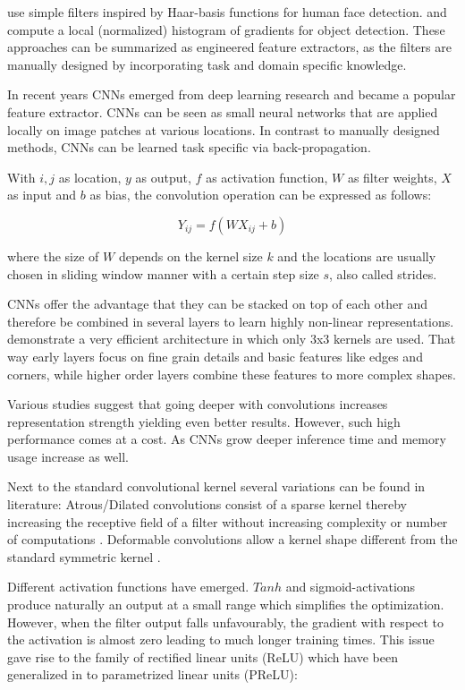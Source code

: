 	\cite{Viola2004} use simple filters inspired by Haar-basis functions for human face detection. \cite{Dalal} and \cite{Lowe2004} compute a local (normalized) histogram of gradients for object detection. These approaches can be summarized as engineered feature extractors, as the filters are manually designed by incorporating task and domain specific knowledge. 
	
	In recent years \acp{CNN} emerged from deep learning research and became a popular feature extractor. \acp{CNN} can be seen as small neural networks that are applied locally on image patches at various locations. In contrast to manually designed methods, \acp{CNN} can be learned task specific via back-propagation.
	
	With $i,j$ as location, $y$ as output, $f$ as activation function, $W$ as filter weights, $X$ as input and $b$ as bias, the convolution operation can be expressed as follows:
	
	$$Y_{ij} = f(WX_{ij} + b)$$
	
	where the size of $W$ depends on the kernel size $k$ and the locations are usually chosen in sliding window manner with a certain step size $s$, also called strides.
	
	\acp{CNN} offer the advantage that they can be stacked on top of each other and therefore be combined in several layers to learn highly non-linear representations.
	 demonstrate a very efficient architecture in which only 3x3 kernels are used. That way early layers focus on fine grain details and basic features like edges and corners, while higher order layers combine these features to more complex shapes. 
	
	Various studies suggest that going deeper with convolutions increases representation strength yielding even better results. However, such high performance comes at a cost. As \acp{CNN} grow deeper inference time and memory usage increase as well.
	
	Next to the standard convolutional kernel several variations can be found in literature: Atrous/Dilated convolutions consist of a sparse kernel thereby increasing the receptive field of a filter without increasing complexity or number of computations . Deformable convolutions allow a kernel shape different from the standard symmetric kernel .
	
	Different activation functions have emerged. $Tanh$ and sigmoid-activations produce naturally an output at a small range which simplifies the optimization. However, when the filter output falls unfavourably, the gradient with respect to the activation is almost zero leading to much longer training times. This issue gave rise to the family of rectified linear units (ReLU) which have been generalized in  to parametrized linear units (PReLU):
	
